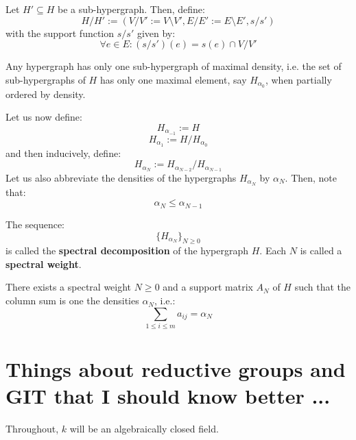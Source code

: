             \begin{definition}
                Let $H' \subseteq H$ be a sub-hypergraph. Then, define:
                    $$H/H' := (V/V' := V \setminus V', E/E' := E \setminus E', s/s')$$
                with the support function $s/s'$ given by:
                    $$\forall e \in E: (s/s')(e) = s(e) \cap V/V'$$
            \end{definition}
            \begin{lemma}
                Any hypergraph has only one sub-hypergraph of maximal density, i.e. the set of sub-hypergraphs of $H$ has only one maximal element, say $H_{\alpha_0}$, when partially ordered by density. 
            \end{lemma}
            Let us now define:
                $$H_{\alpha_{-1}} := H$$
                $$H_{\alpha_1} := H/H_{\alpha_0}$$
            and then inducively, define:
                $$H_{\alpha_N} := H_{\alpha_{N - 2}}/H_{\alpha_{N - 1}}$$
            Let us also abbreviate the densities of the hypergraphs $H_{\alpha_N}$ by $\alpha_N$. Then, note that:
                $$\alpha_N \leq \alpha_{N - 1}$$
            \begin{definition}
                The sequence:
                    $$\{H_{\alpha_N}\}_{N \geq 0}$$
                is called the \textbf{spectral decomposition} of the hypergraph $H$. Each $N$ is called a \textbf{spectral weight}. 
            \end{definition}
            \begin{lemma}
                There exists a spectral weight $N \geq 0$ and a support matrix $A_N$ of $H$ such that the column sum is one the densities $\alpha_N$, i.e.:
                    $$\sum_{1 \leq i \leq m} a_{ij} = \alpha_N$$
            \end{lemma}

    \section{Things about reductive groups and GIT that I should know better ...}
        \begin{convention}
            Throughout, $k$ will be an algebraically closed field.
        \end{convention}
    
